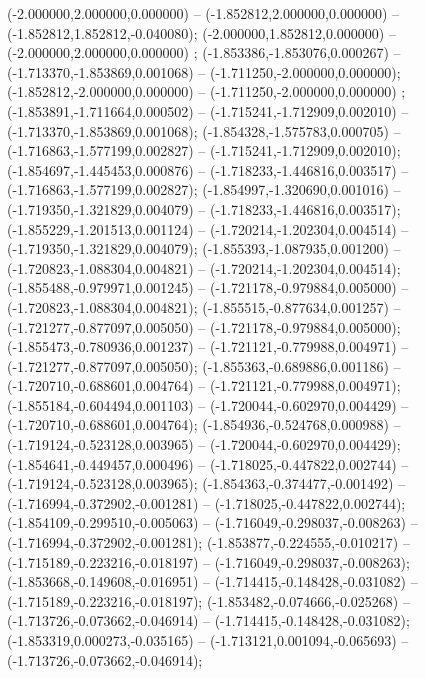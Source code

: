  (-2.000000,2.000000,0.000000) -- (-1.852812,2.000000,0.000000) -- (-1.852812,1.852812,-0.040080);
 (-2.000000,1.852812,0.000000) -- (-2.000000,2.000000,0.000000) ;
 (-1.853386,-1.853076,0.000267) -- (-1.713370,-1.853869,0.001068) -- (-1.711250,-2.000000,0.000000);
 (-1.852812,-2.000000,0.000000) -- (-1.711250,-2.000000,0.000000) ;
 (-1.853891,-1.711664,0.000502) -- (-1.715241,-1.712909,0.002010) -- (-1.713370,-1.853869,0.001068);
 (-1.854328,-1.575783,0.000705) -- (-1.716863,-1.577199,0.002827) -- (-1.715241,-1.712909,0.002010);
 (-1.854697,-1.445453,0.000876) -- (-1.718233,-1.446816,0.003517) -- (-1.716863,-1.577199,0.002827);
 (-1.854997,-1.320690,0.001016) -- (-1.719350,-1.321829,0.004079) -- (-1.718233,-1.446816,0.003517);
 (-1.855229,-1.201513,0.001124) -- (-1.720214,-1.202304,0.004514) -- (-1.719350,-1.321829,0.004079);
 (-1.855393,-1.087935,0.001200) -- (-1.720823,-1.088304,0.004821) -- (-1.720214,-1.202304,0.004514);
 (-1.855488,-0.979971,0.001245) -- (-1.721178,-0.979884,0.005000) -- (-1.720823,-1.088304,0.004821);
 (-1.855515,-0.877634,0.001257) -- (-1.721277,-0.877097,0.005050) -- (-1.721178,-0.979884,0.005000);
 (-1.855473,-0.780936,0.001237) -- (-1.721121,-0.779988,0.004971) -- (-1.721277,-0.877097,0.005050);
 (-1.855363,-0.689886,0.001186) -- (-1.720710,-0.688601,0.004764) -- (-1.721121,-0.779988,0.004971);
 (-1.855184,-0.604494,0.001103) -- (-1.720044,-0.602970,0.004429) -- (-1.720710,-0.688601,0.004764);
 (-1.854936,-0.524768,0.000988) -- (-1.719124,-0.523128,0.003965) -- (-1.720044,-0.602970,0.004429);
 (-1.854641,-0.449457,0.000496) -- (-1.718025,-0.447822,0.002744) -- (-1.719124,-0.523128,0.003965);
 (-1.854363,-0.374477,-0.001492) -- (-1.716994,-0.372902,-0.001281) -- (-1.718025,-0.447822,0.002744);
 (-1.854109,-0.299510,-0.005063) -- (-1.716049,-0.298037,-0.008263) -- (-1.716994,-0.372902,-0.001281);
 (-1.853877,-0.224555,-0.010217) -- (-1.715189,-0.223216,-0.018197) -- (-1.716049,-0.298037,-0.008263);
 (-1.853668,-0.149608,-0.016951) -- (-1.714415,-0.148428,-0.031082) -- (-1.715189,-0.223216,-0.018197);
 (-1.853482,-0.074666,-0.025268) -- (-1.713726,-0.073662,-0.046914) -- (-1.714415,-0.148428,-0.031082);
 (-1.853319,0.000273,-0.035165) -- (-1.713121,0.001094,-0.065693) -- (-1.713726,-0.073662,-0.046914);
